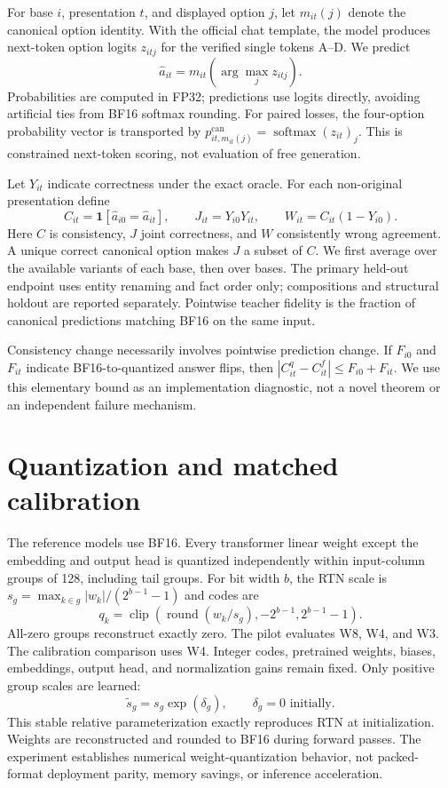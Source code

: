 \documentclass[11pt]{article}
\begin{document}
For base $i$, presentation $t$, and displayed option $j$, let $m_{it}(j)$
denote the canonical option identity. With the official chat template, the
model produces next-token option logits $z_{itj}$ for the verified single
tokens A--D. We predict
\[
 \widehat a_{it}=m_{it}\!\left(\arg\max_j z_{itj}\right).
\]
Probabilities are computed in FP32; predictions use logits directly, avoiding
artificial ties from BF16 softmax rounding. For paired losses, the four-option
probability vector is transported by
$p^{\mathrm{can}}_{it,m_{it}(j)}=\operatorname{softmax}(z_{it})_j$.
This is constrained next-token scoring, not evaluation of free generation.

Let $Y_{it}$ indicate correctness under the exact oracle. For each
non-original presentation define
\[
 C_{it}=\mathbf{1}[\widehat a_{i0}=\widehat a_{it}],\qquad
 J_{it}=Y_{i0}Y_{it},\qquad
 W_{it}=C_{it}(1-Y_{i0}).
\]
Here $C$ is consistency, $J$ joint correctness, and $W$ consistently wrong
agreement. A unique correct canonical option makes $J$ a subset of $C$.
We first average over the available variants of each base, then over bases.
The primary held-out endpoint uses entity renaming and fact order only;
compositions and structural holdout are reported separately. Pointwise
teacher fidelity is the fraction of canonical predictions matching BF16
on the same input.

Consistency change necessarily involves pointwise prediction change.
If $F_{i0}$ and $F_{it}$ indicate BF16-to-quantized answer flips, then
$|C^{q}_{it}-C^{f}_{it}|\leq F_{i0}+F_{it}$. We use this elementary bound
as an implementation diagnostic, not a novel theorem or an independent
failure mechanism.

\section{Quantization and matched calibration}
The reference models use BF16. Every transformer linear weight except the
embedding and output head is quantized independently within input-column
groups of 128, including tail groups. For bit width $b$, the RTN scale is
$s_g=\max_{k\in g}|w_k|/(2^{b-1}-1)$ and codes are
\[
 q_k=\operatorname{clip}\!\left(
 \operatorname{round}(w_k/s_g),-2^{b-1},2^{b-1}-1\right).
\]
All-zero groups reconstruct exactly zero. The pilot evaluates W8, W4, and W3.
The calibration comparison uses W4. Integer codes, pretrained weights,
biases, embeddings, output head, and normalization gains remain fixed.
Only positive group scales are learned:
\[
 \widetilde s_g=s_g\exp(\delta_g),\qquad \delta_g=0\text{ initially}.
\]
This stable relative parameterization exactly reproduces RTN at initialization.
Weights are reconstructed and rounded to BF16 during forward passes.
The experiment establishes numerical weight-quantization behavior, not
packed-format deployment parity, memory savings, or inference acceleration.
\end{document}
